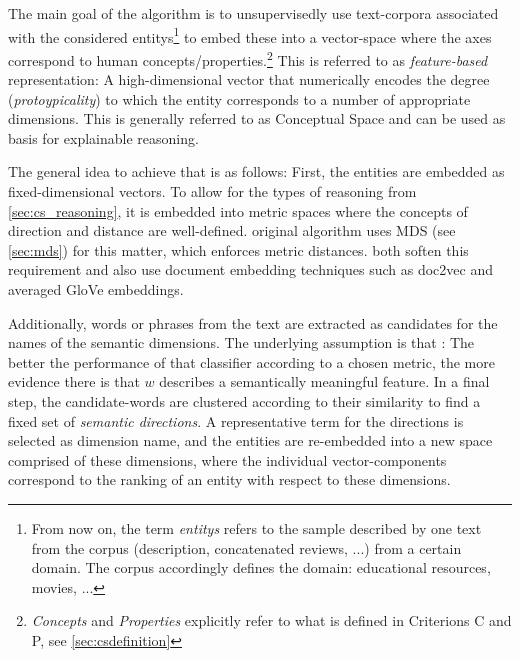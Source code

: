 
The main goal of the algorithm is to unsupervisedly use text-corpora associated with the considered \glspl{entity}\footnote{From now on, the term \textit{\glspl{entity}} refers to the sample described by one text from the corpus (description, concatenated reviews, ...) from a certain domain. The corpus accordingly defines the domain: educational resources, movies, ...} to embed these into a vector-space where the axes correspond to human concepts/properties.\footnote{\textit{Concepts} and \textit{Properties} explicitly refer to what is defined in Criterions C and P, see \ref{sec:csdefinition}} This is referred to as \textit{feature-based} representation: A high-dimensional vector that numerically encodes the degree (\textit{protoypicality}) to which the entity corresponds to a number of appropriate dimensions. This is generally referred to as Conceptual Space and can be used as basis for explainable reasoning.

The general idea to achieve that is as follows: First, the entities are embedded as fixed-dimensional vectors. To allow for the types of reasoning from \autoref{sec:cs_reasoning}, it is embedded into metric spaces where the concepts of direction and distance are well-defined.  original algorithm uses MDS (see \ref{sec:mds}) for this matter, which enforces metric distances. \cite{Ager2018,Alshaikh2020} both soften this requirement and also use document embedding techniques such as \gls{doc2vec} and averaged GloVe \cite{pennington2014glove} embeddings.

Additionally, words or phrases from the text are extracted as candidates for the names of the semantic dimensions. The underlying assumption is that  \cite[3574]{Alshaikh2020}: The better the performance of that classifier according to a chosen metric, the more evidence there is that $w$ describes a semantically meaningful feature. 
In a final step, the candidate-words are clustered according to their similarity to find a fixed set of \emph{semantic directions}. A representative term for the directions is selected as dimension name, and the entities are re-embedded into a new space comprised of these dimensions, where the individual vector-components correspond to the ranking of an entity with respect to these dimensions.

